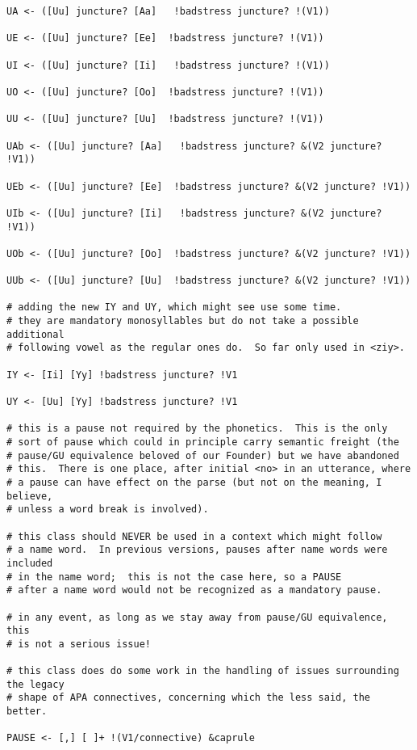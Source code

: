 \documentclass{article}
\begin{document}
\begin{verbatim}
UA <- ([Uu] juncture? [Aa]   !badstress juncture? !(V1))  

UE <- ([Uu] juncture? [Ee]  !badstress juncture? !(V1))  

UI <- ([Uu] juncture? [Ii]   !badstress juncture? !(V1))  

UO <- ([Uu] juncture? [Oo]  !badstress juncture? !(V1))  

UU <- ([Uu] juncture? [Uu]  !badstress juncture? !(V1)) 

UAb <- ([Uu] juncture? [Aa]   !badstress juncture? &(V2 juncture? !V1))  

UEb <- ([Uu] juncture? [Ee]  !badstress juncture? &(V2 juncture? !V1))  

UIb <- ([Uu] juncture? [Ii]   !badstress juncture? &(V2 juncture? !V1))  

UOb <- ([Uu] juncture? [Oo]  !badstress juncture? &(V2 juncture? !V1))  

UUb <- ([Uu] juncture? [Uu]  !badstress juncture? &(V2 juncture? !V1))   

# adding the new IY and UY, which might see use some time.
# they are mandatory monosyllables but do not take a possible additional
# following vowel as the regular ones do.  So far only used in <ziy>.

IY <- [Ii] [Yy] !badstress juncture? !V1

UY <- [Uu] [Yy] !badstress juncture? !V1

# this is a pause not required by the phonetics.  This is the only
# sort of pause which could in principle carry semantic freight (the
# pause/GU equivalence beloved of our Founder) but we have abandoned
# this.  There is one place, after initial <no> in an utterance, where
# a pause can have effect on the parse (but not on the meaning, I believe, 
# unless a word break is involved).

# this class should NEVER be used in a context which might follow
# a name word.  In previous versions, pauses after name words were included
# in the name word;  this is not the case here, so a PAUSE
# after a name word would not be recognized as a mandatory pause.

# in any event, as long as we stay away from pause/GU equivalence, this
# is not a serious issue!

# this class does do some work in the handling of issues surrounding the legacy
# shape of APA connectives, concerning which the less said, the better.

PAUSE <- [,] [ ]+ !(V1/connective) &caprule


\end{verbatim}
\end{document}
